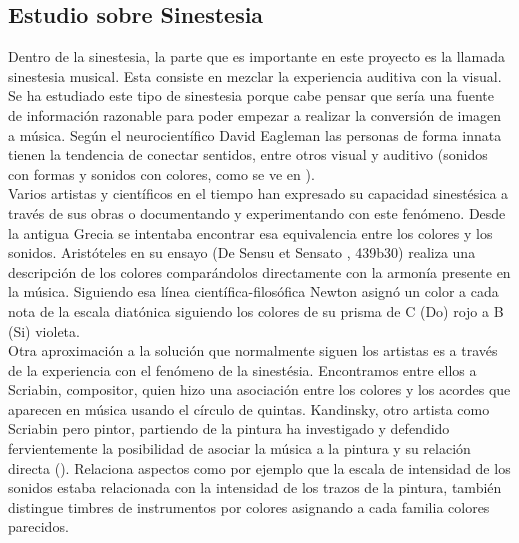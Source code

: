 \subsection{Estudio sobre Sinestesia}
\label{subsubsec:estudioSinestesia}



Dentro de la sinestesia, la parte que es importante en este proyecto es la llamada sinestesia musical. Esta consiste en mezclar la experiencia auditiva con la visual. Se ha estudiado este tipo de sinestesia porque cabe pensar que sería una fuente de información razonable para poder empezar a realizar la conversión de imagen a música.
Según el neurocientífico David Eagleman las personas de forma innata tienen la tendencia de conectar sentidos, entre otros visual y auditivo (sonidos con formas y sonidos con colores, como se ve en \cite{VideoRedesFliparColores}).\\

Varios artistas y científicos en el tiempo han expresado su capacidad sinestésica a través de sus obras o documentando y experimentando con este fenómeno. Desde la antigua Grecia se intentaba encontrar esa equivalencia entre los colores y los sonidos. Aristóteles en su ensayo (De Sensu et Sensato \cite{DeSensuEtSensato}, 439b30) realiza una descripción de los colores comparándolos directamente con la armonía presente en la música. Siguiendo esa línea científica-filosófica Newton asignó un color a cada nota de la escala diatónica siguiendo los colores de su prisma de C (Do) rojo a B (Si) violeta.\\

Otra aproximación a la solución que normalmente siguen los artistas es a través de la experiencia con el fenómeno de la sinestésia. Encontramos entre ellos a Scriabin, compositor, quien hizo una asociación entre los colores y los acordes que aparecen en música usando el círculo de quintas. Kandinsky, otro artista como Scriabin pero pintor, partiendo de la pintura ha investigado y defendido fervientemente la posibilidad de asociar la música a la pintura y su relación directa (\cite{ConcerningSpiritualArt}). Relaciona aspectos como por ejemplo que la escala de intensidad de los sonidos estaba relacionada con la intensidad de los trazos de la pintura, también distingue timbres de instrumentos por colores asignando a cada familia colores parecidos.\\

